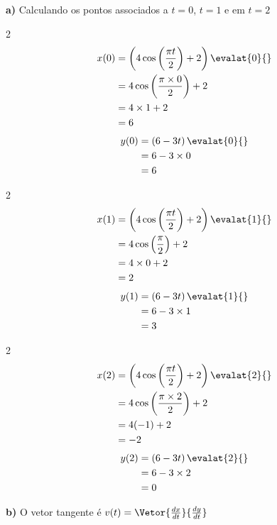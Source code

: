 \documentclass[a4paper,12pt,fleqn]{article}
\begin{document}
\begin{answer}
\textbf{a)} \quad
Calculando os pontos associados a $t=0$, $t=1$ e em $t=2$
\begin{multicols}{2}
\begin{align*}
  x(0)
  & = \left(4\cos\left(\frac{\pi t}{2}\right) + 2 \right)\evalat{0}{} \\
  & = 4\cos\left(\frac{\pi \times 0}{2}\right) + 2 \\
  & = 4 \times 1 + 2 \\
  & = 6
\end{align*}
\newcolumn
\begin{align*}
  y(0)
  & = \left(6 - 3t\right)\evalat{0}{} \\
  & = 6 - 3\times 0 \\
  & = 6
\end{align*}
\end{multicols}
\begin{multicols}{2}
  \begin{align*}
    x(1)
    & = \left(4\cos\left(\frac{\pi t}{2}\right) + 2 \right)\evalat{1}{} \\
    & = 4\cos\left(\frac{\pi}{2}\right) + 2 \\
    & = 4 \times 0 + 2 \\
    & = 2
  \end{align*}
  \newcolumn
  \begin{align*}
    y(1)
    & = \left(6 - 3t\right)\evalat{1}{} \\
    & = 6 - 3\times 1 \\
    & = 3
  \end{align*}
\end{multicols}
\begin{multicols}{2}
  \begin{align*}
    x(2)
    & = \left(4\cos\left(\frac{\pi t}{2}\right) + 2 \right)\evalat{2}{} \\
    & = 4\cos\left(\frac{\pi \times 2}{2}\right) + 2 \\
    & = 4(-1) + 2 \\
    & = -2
  \end{align*}
  \newcolumn
  \begin{align*}
    y(2)
    & = \left(6 - 3t\right)\evalat{2}{} \\
    & = 6 - 3\times 2 \\
    & = 0
  \end{align*}
\end{multicols}

\vspace{-\baselineskip}
\textbf{b)} \quad
O vetor tangente é
\(
  v(t) = \Vetor{\frac{dx}{dt}}{\frac{dy}{dt}}
\)


\end{answer}
\end{document}
